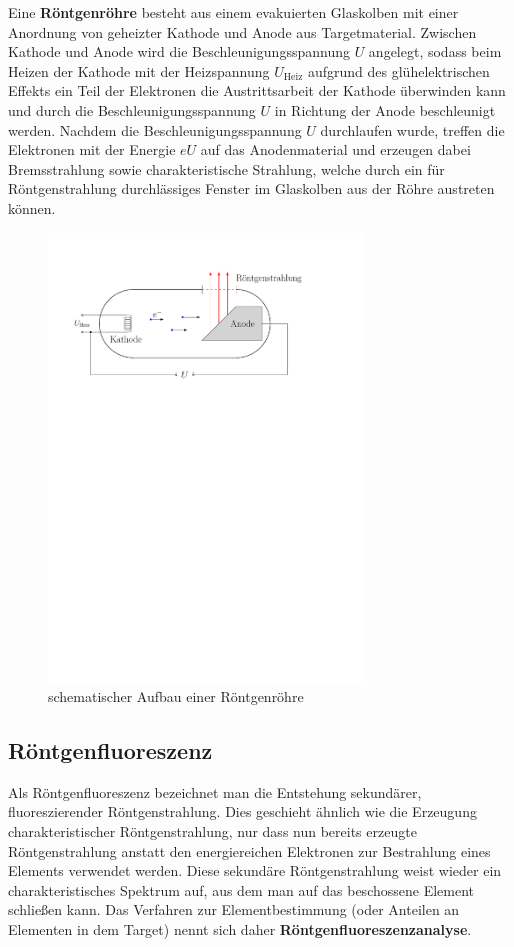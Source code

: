 \documentclass[10pt, a4paper]{article}
\begin{document}
Eine \textbf{Röntgenröhre} besteht aus einem evakuierten Glaskolben mit einer Anordnung von geheizter Kathode und Anode aus Targetmaterial.
Zwischen Kathode und Anode wird die Beschleunigungsspannung $U$ angelegt, sodass beim Heizen der Kathode mit der Heizspannung $U_\mathrm{Heiz}$ aufgrund des glühelektrischen Effekts ein Teil der Elektronen die Austrittsarbeit der Kathode überwinden kann und durch die Beschleunigungsspannung $U$ in Richtung der Anode beschleunigt werden.
Nachdem die Beschleunigungsspannung $U$ durchlaufen wurde, treffen die Elektronen mit der Energie $e U$ auf das Anodenmaterial und erzeugen dabei Bremsstrahlung sowie charakteristische Strahlung, welche durch ein für Röntgenstrahlung durchlässiges Fenster im Glaskolben aus der Röhre austreten können.
\begin{figure}[h]
\centering
\includegraphics[width=0.75\textwidth]{./grafiken/roentgenroehre.pdf}
\caption{schematischer Aufbau einer Röntgenröhre}
\label{fig:roehre}
\end{figure}

\subsection{Röntgenfluoreszenz}
Als Röntgenfluoreszenz bezeichnet man die Entstehung sekundärer, fluoreszierender Röntgenstrahlung.
Dies geschieht ähnlich wie die Erzeugung charakteristischer Röntgenstrahlung, nur dass nun bereits erzeugte Röntgenstrahlung anstatt den energiereichen Elektronen zur Bestrahlung eines Elements verwendet werden.
Diese sekundäre Röntgenstrahlung weist wieder ein charakteristisches Spektrum auf, aus dem man auf das beschossene Element schließen kann.
Das Verfahren zur Elementbestimmung (oder Anteilen an Elementen in dem Target) nennt sich daher \textbf{Röntgenfluoreszenzanalyse}.
\end{document}
